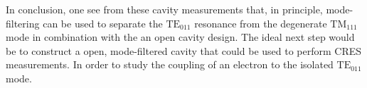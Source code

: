 In conclusion, one see from these cavity measurements that, in principle, mode-filtering can be used to separate the $\mathrm{TE}_{011}$ resonance from the degenerate $\mathrm{TM}_{111}$ mode in combination with the an open cavity design. The ideal next step would be to construct a open, mode-filtered cavity that could be used to perform CRES measurements. In order to study the coupling of an electron to the isolated $\mathrm{TE}_{011}$ mode.
